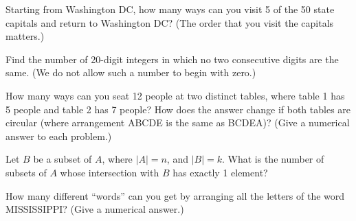 \documentclass[12pt,letterpaper]{hmcpset}
\begin{document}

\begin{problem}[1]
    Starting from Washington DC, how many ways can you visit 5 of the 50 state capitals and return to Washington DC? (The order that you visit the capitals matters.)
\end{problem}
\begin{solution}
    \vfill
\end{solution}
\newpage

\begin{problem}[2]
    Find the number of 20-digit integers in which no two consecutive digits are the same. (We do not allow such a number to begin with zero.)
\end{problem}
\begin{solution}
    \vfill
\end{solution}
\newpage

\begin{problem}[3]
     How many ways can you seat 12 people at two distinct tables, where table 1 has 5 people and table 2 has 7 people? How does the answer change if both tables are circular (where arrangement ABCDE is the same as BCDEA)? (Give a numerical answer to each problem.)
\end{problem}
\begin{solution}
    \vfill
\end{solution}
\newpage

\begin{problem}[4]
    Let $B$ be a subset of $A$, where $|A|=n$, and $|B|=k$. What is the number of subsets of $A$ whose intersection with $B$ has exactly 1 element?
\end{problem}
\begin{solution}
    \vfill
\end{solution}
\newpage

\begin{problem}[5]
    How many different ``words'' can you get by arranging all the letters of the word MISSISSIPPI? (Give a numerical answer.)
\end{problem}
\begin{solution}
    \vfill
\end{solution}
\newpage
\end{document}
